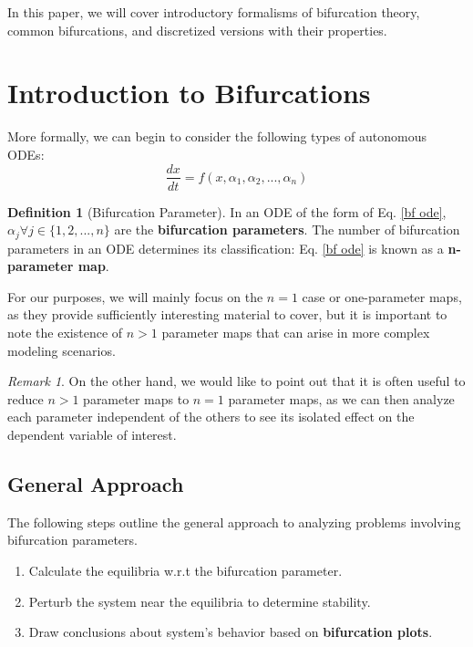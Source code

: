 \documentclass{article}
\theoremstyle{definition}
\newtheorem{definition}{Definition}[section]
\theoremstyle{remark}
\newtheorem*{remark}{Remark}
\begin{document}
In this paper, we will cover introductory formalisms of bifurcation theory, common bifurcations, and discretized versions with their properties.

\section{Introduction to Bifurcations}
More formally, we can begin to consider the following types of autonomous ODEs:
\begin{equation}\label{bf ode}
    \frac{dx}{dt} = f(x, \alpha_1, \alpha_2, ..., \alpha_n)
\end{equation}
\begin{definition}[Bifurcation Parameter]
    In an ODE of the form of Eq. \ref{bf ode}, $\alpha_j \forall j \in \{1, 2, ..., n\}$ are the \textbf{bifurcation parameters}. The number of bifurcation parameters in an ODE determines its classification: Eq. \ref{bf ode} is known as a \textbf{n-parameter map}.
\end{definition}
For our purposes, we will mainly focus on the $n = 1$ case or one-parameter maps, as they provide sufficiently interesting material to cover, but it is important to note the existence of $n > 1$ parameter maps that can arise in more complex modeling scenarios. 
\begin{remark}
On the other hand, we would like to point out that it is often useful to reduce $n > 1$ parameter maps to $n = 1$ parameter maps, as we can then analyze each parameter independent of the others to see its isolated effect on the dependent variable of interest. 
\end{remark}



\subsection{General Approach}
The following steps outline the general approach to analyzing problems involving bifurcation parameters.  
\begin{enumerate}
    \item Calculate the equilibria w.r.t the bifurcation parameter.
    \item Perturb the system near the equilibria to determine stability.
    \item Draw conclusions about system's behavior based on \textbf{bifurcation plots}.
\end{enumerate}
\end{document}
